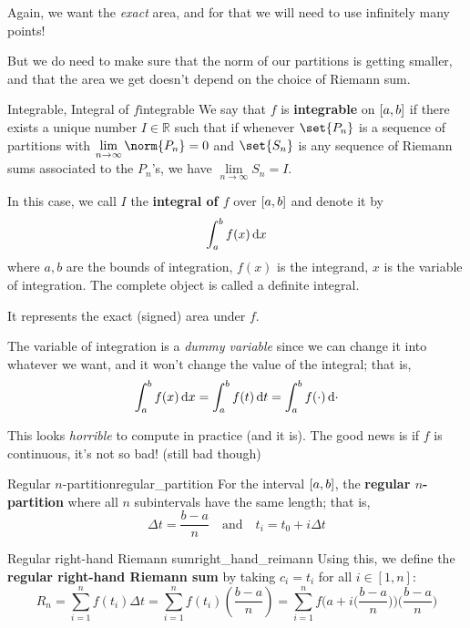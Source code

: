 Again, we want the \emph{exact} area, and for that we will need to use infinitely
many points!

But we do need to make sure that the norm of our partitions is getting smaller,
and that the area we get doesn't depend on the choice of Riemann sum.

\begin{Definition}{Integrable, Integral of $ f $}{integrable}
    We say that $ f $ is \textbf{integrable} on $ \interval{a}{b} $ if there exists a unique number
    $ I\in\mathbb{R} $ such that if whenever $ \set{P_n} $ is a sequence of partitions with
    $ \lim\limits_{{n} \to {\infty}}\norm{P_n}=0 $ and $ \set{S_n} $ is any sequence of
    Riemann sums associated to the $ P_n $'s, we have $ \lim\limits_{{n} \to {\infty}} S_n=I $.

    In this case, we call $ I $ the \textbf{integral of $ f $} over $ \interval{a}{b} $
    and denote it by
    \[ \int_{a}^{b} f(x)\odif{x} \]
    where $ a,b $ are the bounds of integration, $ f(x) $ is the integrand, $ x $ is the
    variable of integration. The complete object is called a definite integral.

    It represents the exact (signed) area under $ f $.
\end{Definition}

\begin{Remark}{}{}
    The variable of integration is a \emph{dummy variable} since we can change it into
    whatever we want, and it won't change the value of the integral; that is,
    \[
        \int_{a}^{b} f(x)\odif{x} =
        \int_{a}^{b} f(t)\odif{t}=
        \int_{a}^{b} f(\cdot)\odif{\cdot}
    \]
\end{Remark}

This looks \emph{horrible} to compute in practice (and it is). The good news is if
$ f $ is continuous, it's not so bad! (still bad though)

\begin{Definition}{Regular $n$-partition}{regular_partition}
    For the interval $ \interval{a}{b} $, the \textbf{regular $ n $-partition}
    where all $ n $ subintervals
    have the same length; that is,
    \[ \Delta t=\frac{b-a}{n} \quad\text{and}\quad  t_i=t_0+i\Delta t \]
\end{Definition}

\begin{Definition}{Regular right-hand Riemann sum}{right_hand_reimann}
    Using this, we define the \textbf{regular right-hand Riemann sum} by taking $ c_i=t_i $ for
    all $ i\in[1,n] $:
    \[ R_n
        =\sum\limits_{i=1}^{n} f(t_i)\Delta t
        =\sum\limits_{i=1}^{n} f(t_i)\left(\frac{b-a}{n}\right)
        =\sum\limits_{i=1}^{n} f\Biggl(a+i\biggl(\frac{b-a}{n}\biggr)\Biggr)\biggl(\frac{b-a}{n}\biggr) \]
\end{Definition}


